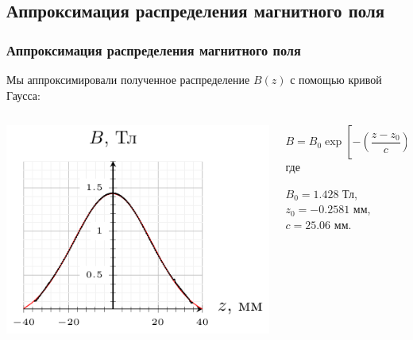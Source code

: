 \documentclass[10pt,pdf,hyperref={unicode}, dvipsnames]{beamer}
\begin{document}
\begin{frame}
	\subsection{Аппроксимация распределения магнитного поля}
	\frametitle{Аппроксимация распределения магнитного поля}
	Мы аппроксимировали полученное распределение $B(z)$ с помощью кривой Гаусса:\vspace{-1em}
	\begin{columns}
		\begin{column}{0.6\textwidth}
			\begin{center}
				\hspace{4em}
				\includegraphics[width=1\textwidth]{images/b_from_z}
			\end{center}
		\end{column}
		\begin{column}[]{0.4\textwidth}
			\begin{equation*} 
				B=B_0%
				\exp 
				\left[
					-\left(
					\frac{z-z_0}{c}
					\right)^2
					\right], 
			\end{equation*}
			где 
			
			$B_0=1.428$ Тл, \\
			$z_0=-0.2581$ мм,\\
			$c=25.06$ мм.
		\end{column}
	\end{columns}
\end{frame}
\end{document}
